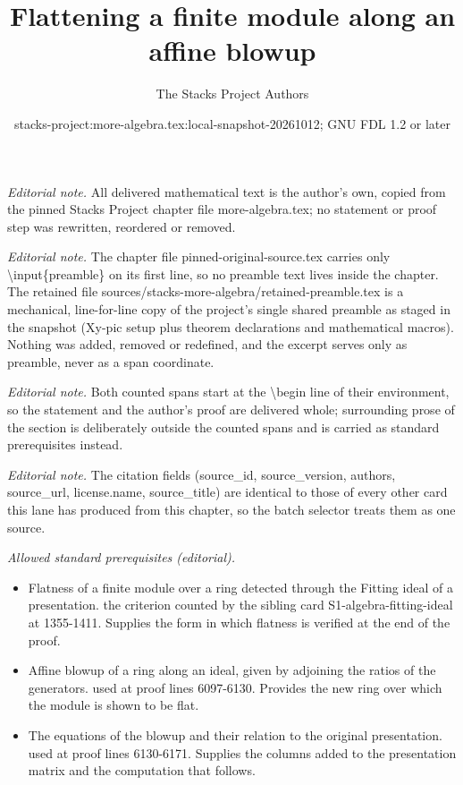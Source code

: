 \documentclass[10pt,a4paper]{amsart}
\title{Flattening a finite module along an affine blowup}
\author{The Stacks Project Authors}
\date{stacks-project:more-algebra.tex:local-snapshot-20261012; GNU FDL 1.2 or later}
\theoremstyle{plain}
\theoremstyle{definition}
\theoremstyle{remark}
\numberwithin{equation}{subsection}
\begin{document}
\maketitle
\setcounter{subsection}{1}
\noindent\textit{Editorial note.} All delivered mathematical text is the author's own, copied from the pinned Stacks Project chapter file more-algebra.tex; no statement or proof step was rewritten, reordered or removed.\par\medskip
\noindent\textit{Editorial note.} The chapter file pinned-original-source.tex carries only \textbackslash{}input\{preamble\} on its first line, so no preamble text lives inside the chapter. The retained file sources/stacks-more-algebra/retained-preamble.tex is a mechanical, line-for-line copy of the project's single shared preamble as staged in the snapshot (Xy-pic setup plus theorem declarations and mathematical macros). Nothing was added, removed or redefined, and the excerpt serves only as preamble, never as a span coordinate.\par\medskip
\noindent\textit{Editorial note.} Both counted spans start at the \textbackslash{}begin line of their environment, so the statement and the author's proof are delivered whole; surrounding prose of the section is deliberately outside the counted spans and is carried as standard prerequisites instead.\par\medskip
\noindent\textit{Editorial note.} The citation fields (source\_id, source\_version, authors, source\_url, license.name, source\_title) are identical to those of every other card this lane has produced from this chapter, so the batch selector treats them as one source.\par\medskip
\noindent\textit{Allowed standard prerequisites (editorial).}\begin{itemize}
\item Flatness of a finite module over a ring detected through the Fitting ideal of a presentation. the criterion counted by the sibling card S1-algebra-fitting-ideal at 1355-1411. Supplies the form in which flatness is verified at the end of the proof.
\item Affine blowup of a ring along an ideal, given by adjoining the ratios of the generators. used at proof lines 6097-6130. Provides the new ring over which the module is shown to be flat.
\item The equations of the blowup and their relation to the original presentation. used at proof lines 6130-6171. Supplies the columns added to the presentation matrix and the computation that follows.
\end{itemize}\medskip
\end{document}

